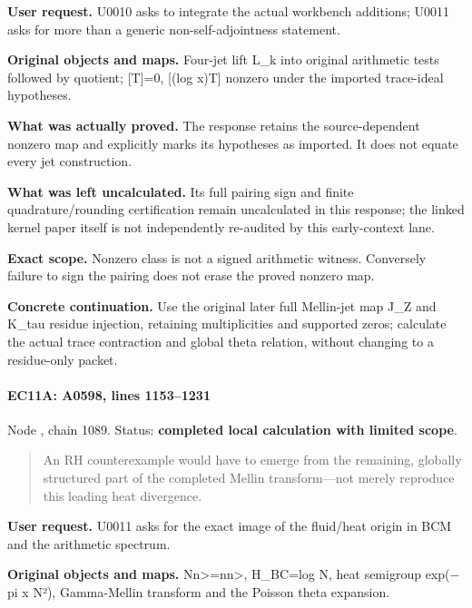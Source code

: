 \textbf{User request.} U0010 asks to integrate the actual workbench
additions; U0011 asks for more than a generic non-self-adjointness
statement.

\textbf{Original objects and maps.} Four-jet lift L\_k into original
arithmetic tests followed by quotient; {[}T{]}=0, {[}(log x)T{]} nonzero
under the imported trace-ideal hypotheses.

\textbf{What was actually proved.} The response retains the
source-dependent nonzero map and explicitly marks its hypotheses as
imported. It does not equate every jet construction.

\textbf{What was left uncalculated.} Its full pairing sign and finite
quadrature/rounding certification remain uncalculated in this response;
the linked kernel paper itself is not independently re-audited by this
early-context lane.

\textbf{Exact scope.} Nonzero class is not a signed arithmetic witness.
Conversely failure to sign the pairing does not erase the proved nonzero
map.

\textbf{Concrete continuation.} Use the original later full Mellin-jet
map J\_Z and K\_tau residue injection, retaining multiplicities and
supported zeros; calculate the actual trace contraction and global theta
relation, without changing to a residue-only packet.

\paragraph{EC11A: A0598, lines
1153--1231}\label{ec11a-a0598-lines-11531231}

Node \protect{}, chain 1089.
Status: \textbf{completed local calculation with limited scope}.

\begin{quote}
An RH counterexample would have to emerge from the remaining, globally
structured part of the completed Mellin transform---not merely reproduce
this leading heat divergence.
\end{quote}

\textbf{User request.} U0011 asks for the exact image of the fluid/heat
origin in BCM and the arithmetic spectrum.

\textbf{Original objects and maps.}
N\textbar n\textgreater=n\textbar n\textgreater, H\_BC=log N, heat
semigroup exp(\allowbreak{}\ensuremath{−}\allowbreak{}pi x N²),
Gamma-Mellin transform and the Poisson theta expansion.

